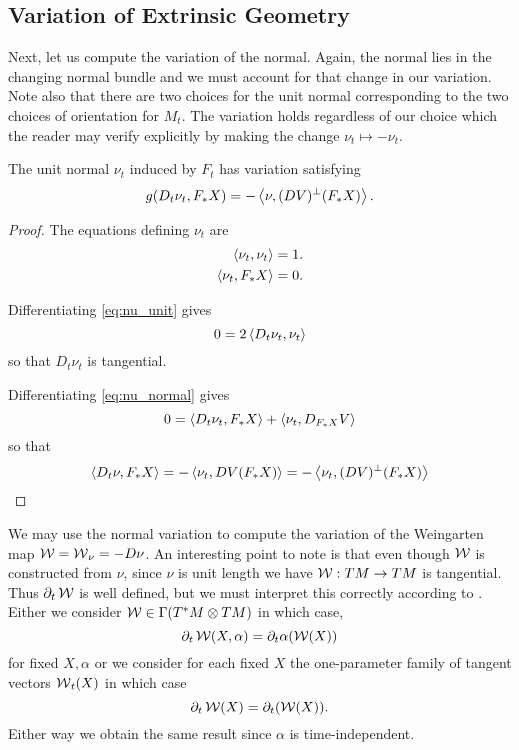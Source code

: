 \subsection*{Variation of Extrinsic Geometry}

Next, let us compute the variation of the normal. Again, the normal lies in the changing normal bundle and we must account for that change in our variation. Note also that there are two choices for the unit normal corresponding to the two choices of orientation for \(M_t\). The variation holds regardless of our choice which the reader may verify explicitly by making the change \(\nu_t \mapsto -\nu_t\).

\begin{lemma}
\label{lem:nu_t}
The unit normal \(\nu_t\) induced by \(F_t\) has variation satisfying
\[
g(D_t \nu_t, F_{\ast} X) = - \left\langle \nu,(DV)^{\perp} (F_{\ast} X) \right\rangle.
\]
\end{lemma}

\begin{proof}
The equations defining \(\nu_t\) are
\begin{align}
\label{eq:nu_unit}
\left\langle \nu_t,\nu_t \right\rangle &= 1. \\
\label{eq:nu_normal}
\left\langle \nu_t,F_{\ast} X \right\rangle &= 0.
\end{align}

Differentiating \eqref{eq:nu_unit} gives
\[
0 = 2 \left\langle D_t \nu_t,\nu_t \right\rangle
\]
so that \(D_t \nu_t\) is tangential.

Differentiating \eqref{eq:nu_normal} gives
\[
0 = \left\langle D_t \nu_t,F_{\ast} X \right\rangle + \left\langle \nu_t,D_{F_{\ast} X} V \right\rangle
\]
so that
\[
\left\langle D_t \nu,F_{\ast} X \right\rangle = - \left\langle \nu_t,DV(F_{\ast} X) \right\rangle = - \left\langle \nu_t,(DV)^{\perp}(F_{\ast} X) \right\rangle
\]
\end{proof}

We may use the normal variation to compute the variation of the Weingarten map \(\operatorname{\mathcal{W}} = \operatorname{\mathcal{W}}_{\nu} = -D\nu\). An interesting point to note is that even though \(\operatorname{\mathcal{W}}\) is constructed from \(\nu\), since \(\nu\) is unit length we have \(\operatorname{\mathcal{W}} : TM \to TM\) is tangential. Thus \(\partial_t \operatorname{\mathcal{W}}\) is well defined, but we must interpret this correctly according to . Either we consider \(\operatorname{\mathcal{W}} \in \Gamma(T^{\ast} M \otimes TM)\) in which case,
\[
\partial_t \operatorname{\mathcal{W}} (X, \alpha) = \partial_t \alpha(\operatorname{\mathcal{W}}(X))
\]
for fixed \(X, \alpha\) or we consider for each fixed \(X\) the one-parameter family of tangent vectors \(\operatorname{\mathcal{W}}_t(X)\) in which case
\[
\partial_t \operatorname{\mathcal{W}} (X) = \partial_t (\operatorname{\mathcal{W}}(X)).
\]
Either way we obtain the same result since \(\alpha\) is time-independent.

